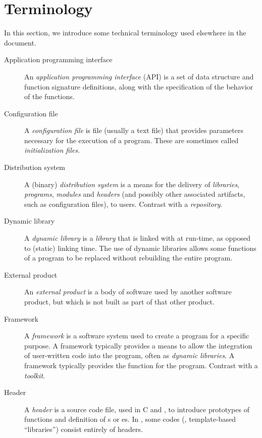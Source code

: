 \documentclass[draftmode,draftwater]{memarticle}
\begin{document}
\section{Terminology\label{sec:terminology}}

In this section, we introduce some technical terminology used
elsewhere in the document.

\begin{description}

\item[Application programming interface] An \emph{application
    programming interface} (API) is a set of data structure and function
  signature definitions, along with the specification of the behavior of
  the functions.

\item[Configuration file] A \emph{configuration file} is file (usually
  a text file) that provides parameters necessary for the execution of
  a program. These are sometimes called \emph{initialization files}.

\item[Distribution system] A (binary) \emph{distribution system} is a
  means for the delivery of \emph{libraries}, \emph{programs},
  \emph{modules} and \emph{headers} (and possibly other associated
  artifacts, such as configuration files), to users. Contrast with a
  \emph{repository}.

\item[Dynamic library] A \emph{dynamic library} is a \emph{library} that
  is linked with at run-time, as opposed to (static) linking time. The
  use of dynamic libraries allows some functions of a program to be
  replaced without rebuilding the entire program.

\item[External product] An \emph{external product} is a body of software
  used by another software product, but which is not built as part of
  that other product.

\item[Framework] A \emph{framework} is a software system used to
  create a program for a specific purpose. A framework typically
  provides a means to allow the integration of user-written code into
  the program, often as \emph{dynamic libraries}.
  A framework typically provides the  function
  for the program. Contrast with a \emph{toolkit}.

\item[Header] A \emph{header} is a source code file, used in C and
  \cpp, to introduce prototypes of functions and definition of
  s or es. In \cpp, some codes (\eg,
  template-based ``libraries'') consist entirely of headers.


\end{description}
\end{document}
